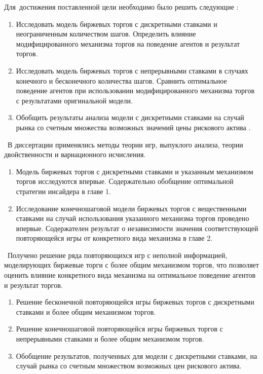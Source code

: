 Для~достижения поставленной цели необходимо было решить следующие {\tasks}:
\begin{enumerate}
\item Исследовать модель биржевых торгов с дискретными ставками и неограниченным
  количеством шагов. Определить влияние модифицированного механизма торгов на
  поведение агентов и результат торгов.
\item Исследовать модель биржевых торгов с непрерывными ставками в случаях
  конечного и бесконечного количества шагов. Сравнить оптимальное поведение
  агентов при использовании модифицированного механизма торгов с результатами
  оригинальной модели.
\item Обобщить результаты анализа модели с дискретными ставками на случай рынка
  со счетным множества возможных значений цены рискового актива .
\end{enumerate}

\methods\ В диссертации применялись методы теории игр, выпуклого анализа, теории
двойственности и вариационного исчисления.

\novelty
\begin{enumerate}
\item Модель биржевых торгов с дискретными ставками и указанным механизмом
  торгов исследуются впервые. Содержательно обобщение оптимальной стратегии
  инсайдера в главе 1.
\item Исследование конечношаговой модели биржевых торгов с вещественными
  ставками на случай использования указанного механизма торгов проведено
  впервые. Содержателен результат о независимости значения соответствующей
  повторяющейся игры от конкретного вида механизма в главе 2.
\end{enumerate}

\influence\ Получено решение ряда повторяющихся игр с неполной информацией,
моделирующих биржевые торги с более общим механизмом торгов, что позволяет
оценить влияние конкретного вида механизма на оптимальное поведение агентов и
результат торгов.

\begin{enumerate}
  \item Решение бесконечной повторяющейся игры биржевых торгов с дискретными ставками и
    более общим механизмом торгов.
  \item Решение конечношаговой повторяющейся игры биржевых торгов с непрерывными
    ставками и более общим механизмом торгов.
  \item Обобщение результатов, полученных для модели с дискретными ставками, на
    случай рынка со счетным множеством возможных цен рискового актива.
\end{enumerate}

